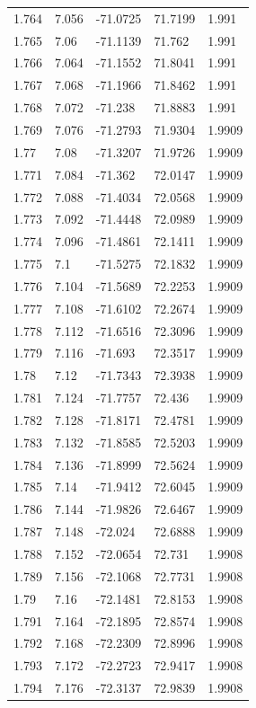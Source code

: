\begin{tabular}{lllll}
1.764 & 7.056 & -71.0725 & 71.7199 & 1.991 \\
1.765 & 7.06 & -71.1139 & 71.762 & 1.991 \\
1.766 & 7.064 & -71.1552 & 71.8041 & 1.991 \\
1.767 & 7.068 & -71.1966 & 71.8462 & 1.991 \\
1.768 & 7.072 & -71.238 & 71.8883 & 1.991 \\
1.769 & 7.076 & -71.2793 & 71.9304 & 1.9909 \\
1.77 & 7.08 & -71.3207 & 71.9726 & 1.9909 \\
1.771 & 7.084 & -71.362 & 72.0147 & 1.9909 \\
1.772 & 7.088 & -71.4034 & 72.0568 & 1.9909 \\
1.773 & 7.092 & -71.4448 & 72.0989 & 1.9909 \\
1.774 & 7.096 & -71.4861 & 72.1411 & 1.9909 \\
1.775 & 7.1 & -71.5275 & 72.1832 & 1.9909 \\
1.776 & 7.104 & -71.5689 & 72.2253 & 1.9909 \\
1.777 & 7.108 & -71.6102 & 72.2674 & 1.9909 \\
1.778 & 7.112 & -71.6516 & 72.3096 & 1.9909 \\
1.779 & 7.116 & -71.693 & 72.3517 & 1.9909 \\
1.78 & 7.12 & -71.7343 & 72.3938 & 1.9909 \\
1.781 & 7.124 & -71.7757 & 72.436 & 1.9909 \\
1.782 & 7.128 & -71.8171 & 72.4781 & 1.9909 \\
1.783 & 7.132 & -71.8585 & 72.5203 & 1.9909 \\
1.784 & 7.136 & -71.8999 & 72.5624 & 1.9909 \\
1.785 & 7.14 & -71.9412 & 72.6045 & 1.9909 \\
1.786 & 7.144 & -71.9826 & 72.6467 & 1.9909 \\
1.787 & 7.148 & -72.024 & 72.6888 & 1.9909 \\
1.788 & 7.152 & -72.0654 & 72.731 & 1.9908 \\
1.789 & 7.156 & -72.1068 & 72.7731 & 1.9908 \\
1.79 & 7.16 & -72.1481 & 72.8153 & 1.9908 \\
1.791 & 7.164 & -72.1895 & 72.8574 & 1.9908 \\
1.792 & 7.168 & -72.2309 & 72.8996 & 1.9908 \\
1.793 & 7.172 & -72.2723 & 72.9417 & 1.9908 \\
1.794 & 7.176 & -72.3137 & 72.9839 & 1.9908 \\

\end{tabular}
